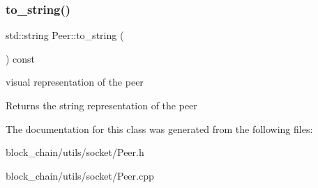\subsubsection{\texorpdfstring{to\+\_\+string()}{to\_string()}}
{\footnotesize\ttfamily std\+::string Peer\+::to\+\_\+string (\begin{DoxyParamCaption}{ }\end{DoxyParamCaption}) const}

visual representation of the peer

\begin{DoxyReturn}{Returns}
the string representation of the peer 
\end{DoxyReturn}


The documentation for this class was generated from the following files\+:\begin{DoxyCompactItemize}
\item 
block\+\_\+chain/utils/socket/Peer.\+h\item 
block\+\_\+chain/utils/socket/Peer.\+cpp\end{DoxyCompactItemize}
